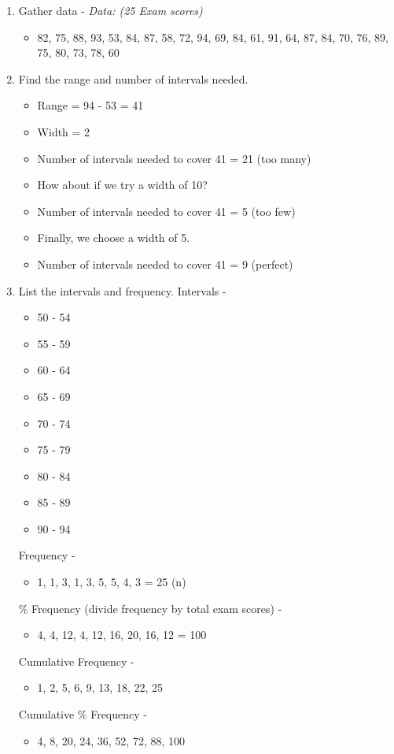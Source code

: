 \documentclass[11pt]{report}
\begin{document}
{
    \begin{enumerate}
        \item Gather data - \textit{Data: (25 Exam scores)}
        \begin{itemize}
            \item 82, 75, 88, 93, 53, 84, 87, 58, 72, 94, 69, 84, 61, 91, 64, 87, 84, 70, 76, 89, 75, 80, 73, 78, 60
        \end{itemize}
        \item Find the range and number of intervals needed.
        \begin{itemize}
            \item Range = 94 - 53 = 41
            \item Width = 2 
            \item Number of intervals needed to cover 41 = 21 (too many)
            \item How about if we try a width of 10? 
            \item Number of intervals needed to cover 41 = 5 (too few)
            \item Finally, we choose a width of 5. 
            \item Number of intervals needed to cover 41 = 9 (perfect) 
        \end{itemize}
        \item List the intervals and frequency.
        Intervals - 
        \begin{itemize}
            \item 50 - 54 
            \item 55 - 59
            \item 60 - 64
            \item 65 - 69
            \item 70 - 74
            \item 75 - 79
            \item 80 - 84
            \item 85 - 89
            \item 90 - 94
        \end{itemize}
        Frequency - 
        \begin{itemize}
            \item 1, 1, 3, 1, 3, 5, 5, 4, 3 = 25 (n)
        \end{itemize}
        \% Frequency (divide frequency by total exam scores) -
        \begin{itemize}
            \item 4, 4, 12, 4, 12, 16, 20, 16, 12 = 100
        \end{itemize}
        Cumulative Frequency -
        \begin{itemize}
            \item 1, 2, 5, 6, 9, 13, 18, 22, 25
        \end{itemize}
        Cumulative \% Frequency -
        \begin{itemize}
            \item 4, 8, 20, 24, 36, 52, 72, 88, 100
        \end{itemize}
    \end{enumerate}

}
\end{document}
